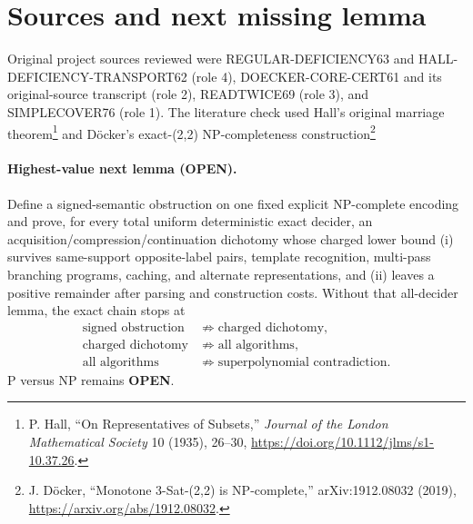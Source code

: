 \documentclass[11pt]{article}
\begin{document}
\section{Sources and next missing lemma}

Original project sources reviewed were REGULAR-DEFICIENCY63 and
HALL-DEFICIENCY-TRANSPORT62 (role 4), DOECKER-CORE-CERT61 and its original-source
transcript (role 2), READTWICE69 (role 3), and SIMPLECOVER76 (role 1).  The literature check
used Hall's original marriage theorem\footnote{P. Hall, ``On Representatives of Subsets,''
\emph{Journal of the London Mathematical Society} 10 (1935), 26--30,
\url{https://doi.org/10.1112/jlms/s1-10.37.26}.} and D\"ocker's exact-(2,2) NP-completeness
construction\footnote{J. D\"ocker, ``Monotone 3-Sat-(2,2) is NP-complete,''
arXiv:1912.08032 (2019),
\url{https://arxiv.org/abs/1912.08032}.}

\paragraph{Highest-value next lemma (OPEN).}
Define a signed-semantic obstruction on one fixed explicit NP-complete encoding and prove,
for every total uniform deterministic exact decider, an acquisition/compression/continuation
dichotomy whose charged lower bound (i) survives same-support opposite-label pairs,
template recognition, multi-pass branching programs, caching, and alternate representations,
and (ii) leaves a positive remainder after parsing and construction costs.  Without that
all-decider lemma, the exact chain stops at
\[
\begin{aligned}
\text{signed obstruction}&\not\Longrightarrow\text{charged dichotomy},\\
\text{charged dichotomy}&\not\Longrightarrow\text{all algorithms},\\
\text{all algorithms}&\not\Longrightarrow\text{superpolynomial contradiction}.
\end{aligned}
\]
P versus NP remains \textbf{OPEN}.
\end{document}
